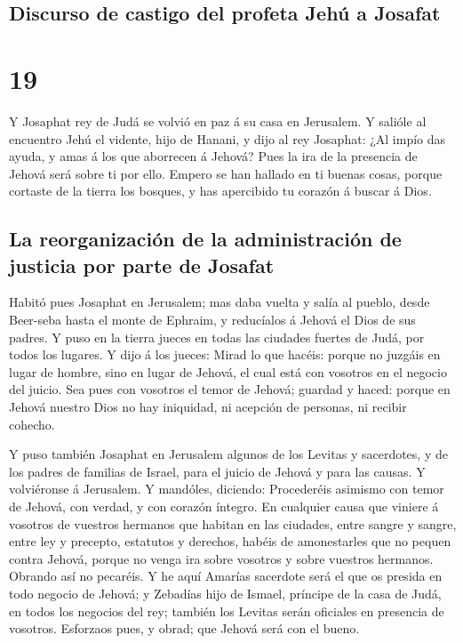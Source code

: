 \hypertarget{discurso-de-castigo-del-profeta-jehuxfa-a-josafat}{%
\subsection{Discurso de castigo del profeta Jehú a
Josafat}\label{discurso-de-castigo-del-profeta-jehuxfa-a-josafat}}

\hypertarget{section-14-19}{%
\section{19}\label{section-14-19}}

 Y Josaphat rey de Judá se volvió en paz á su casa en
Jerusalem.  Y salióle al encuentro Jehú el vidente, hijo
de Hanani, y dijo al rey Josaphat: ¿Al impío das ayuda, y amas á los que
aborrecen á Jehová? Pues la ira de la presencia de Jehová será sobre ti
por ello.  Empero se han hallado en ti buenas cosas,
porque cortaste de la tierra los bosques, y has apercibido tu corazón á
buscar á Dios.

\hypertarget{la-reorganizaciuxf3n-de-la-administraciuxf3n-de-justicia-por-parte-de-josafat}{%
\subsection{La reorganización de la administración de justicia por parte
de
Josafat}\label{la-reorganizaciuxf3n-de-la-administraciuxf3n-de-justicia-por-parte-de-josafat}}

 Habitó pues Josaphat en Jerusalem; mas daba vuelta y
salía al pueblo, desde Beer-seba hasta el monte de Ephraim, y reducíalos
á Jehová el Dios de sus padres.  Y puso en la tierra
jueces en todas las ciudades fuertes de Judá, por todos los lugares.
 Y dijo á los jueces: Mirad lo que hacéis: porque no
juzgáis en lugar de hombre, sino en lugar de Jehová, el cual está con
vosotros en el negocio del juicio.  Sea pues con vosotros
el temor de Jehová; guardad y haced: porque en Jehová nuestro Dios no
hay iniquidad, ni acepción de personas, ni recibir cohecho.

 Y puso también Josaphat en Jerusalem algunos de los
Levitas y sacerdotes, y de los padres de familias de Israel, para el
juicio de Jehová y para las causas. Y volviéronse á Jerusalem.
 Y mandóles, diciendo: Procederéis asimismo con temor de
Jehová, con verdad, y con corazón íntegro.  En cualquier
causa que viniere á vosotros de vuestros hermanos que habitan en las
ciudades, entre sangre y sangre, entre ley y precepto, estatutos y
derechos, habéis de amonestarles que no pequen contra Jehová, porque no
venga ira sobre vosotros y sobre vuestros hermanos. Obrando así no
pecaréis.  Y he aquí Amarías sacerdote será el que os
presida en todo negocio de Jehová; y Zebadías hijo de Ismael, príncipe
de la casa de Judá, en todos los negocios del rey; también los Levitas
serán oficiales en presencia de vosotros. Esforzaos pues, y obrad; que
Jehová será con el bueno.

